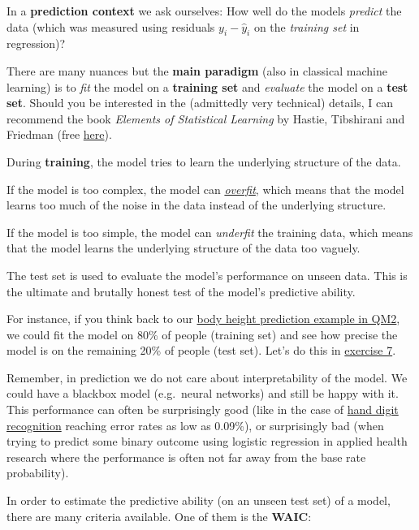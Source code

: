 \documentclass[
]{book}
\begin{document}
In a \textbf{prediction context} we ask ourselves:
How well do the models \emph{predict} the data
(which was measured using residuals \(y_i - \hat{y}_i\) on the
\emph{training set} in regression)?

There are many nuances but the \textbf{main paradigm} (also in classical machine learning) is to
\emph{fit} the model on a \textbf{training set} and \emph{evaluate} the model on a \textbf{test set}.
Should you be interested in the (admittedly very technical) details,
I can recommend the book \emph{Elements of Statistical Learning} by Hastie,
Tibshirani and Friedman (free \href{https://www.sas.upenn.edu/~fdiebold/NoHesitations/BookAdvanced.pdf}{here}).

During \textbf{training}, the model tries to learn the underlying structure of the data.

If the model is too complex, the model can \href{https://miro.medium.com/v2/resize:fit:1400/format:webp/1*_7OPgojau8hkiPUiHoGK_w.png}{\emph{overfit}},
which means that the model learns too much of the noise in the data instead of the underlying structure.

If the model is too simple, the model can \emph{underfit} the training data,
which means that the model learns the underlying structure of the data too vaguely.

The test set is used to evaluate the model's performance on unseen data.
This is the ultimate and brutally honest test of the model's predictive ability.

For instance, if you think back to our \href{https://jdegenfellner.github.io/Script_QM2_ZHAW/multiple-linear-regression.html\#adding_transformed_predictor_bayes}{body height prediction example in QM2},
we could fit the model on 80\% of people (training set) and see how precise the model is on
the remaining 20\% of people (test set). Let's do this in \hyperref[exercise7_LMM]{exercise 7}.

Remember, in prediction we do not care about interpretability of the model.
We could have a blackbox model (e.g.~neural networks) and still be happy with it.
This performance can often be surprisingly good (like in the case of \href{https://en.wikipedia.org/wiki/MNIST_database\#Classifiers}{hand digit
recognition} reaching error rates as low as 0.09\%),
or surprisingly bad (when trying to predict some binary outcome using logistic regression in applied health
research where the performance is often not far away from the base rate probability).

In order to estimate the predictive ability (on an unseen test set) of a model,
there are many criteria available. One of them is the \textbf{WAIC}:
\end{document}
